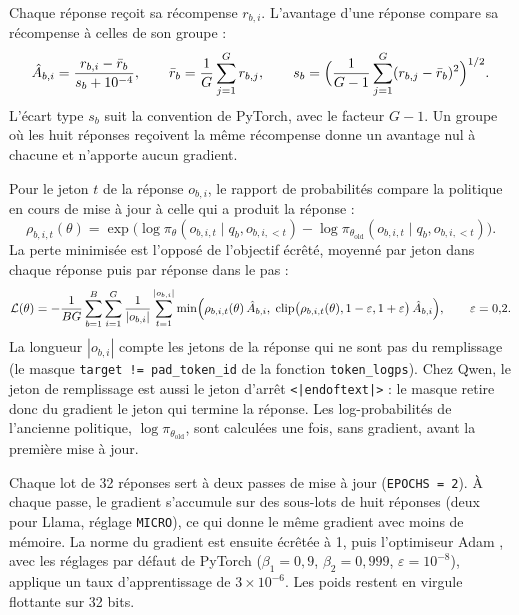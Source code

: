 Chaque réponse reçoit sa récompense $r_{b,i}$. L'avantage
d'une réponse compare sa récompense à celles de son groupe :
\begin{equation}
  \hat A_{b,i} = \frac{r_{b,i} - \bar r_b}{s_b + 10^{-4}}, \qquad
  \bar r_b = \frac1G \sum_{j=1}^{G} r_{b,j}, \qquad
  s_b = \Bigl(\frac{1}{G-1}\sum_{j=1}^{G} (r_{b,j} - \bar r_b)^2\Bigr)^{1/2}.
\end{equation}
L'écart type $s_b$ suit la convention de PyTorch, avec le facteur $G-1$. Un groupe où les huit
réponses reçoivent la même récompense donne un avantage nul à chacune et n'apporte aucun gradient.

Pour le jeton $t$ de la réponse $o_{b,i}$, le rapport de probabilités compare la politique en cours
de mise à jour à celle qui a produit la réponse :
\begin{equation}
  \rho_{b,i,t}(\theta) = \exp\bigl(\log \pi_\theta(o_{b,i,t} \mid q_b, o_{b,i,<t})
    - \log \pi_{\theta_{\text{old}}}(o_{b,i,t} \mid q_b, o_{b,i,<t})\bigr).
\end{equation}
La perte minimisée est l'opposé de l'objectif écrêté, moyenné par jeton dans chaque réponse puis
par réponse dans le pas :
\begin{equation}
  \mathcal L(\theta) = -\frac{1}{BG} \sum_{b=1}^{B} \sum_{i=1}^{G} \frac{1}{|o_{b,i}|}
  \sum_{t=1}^{|o_{b,i}|} \min\Bigl(\rho_{b,i,t}(\theta)\,\hat A_{b,i},\;
  \operatorname{clip}\bigl(\rho_{b,i,t}(\theta), 1-\varepsilon, 1+\varepsilon\bigr)\,\hat A_{b,i}\Bigr),
  \qquad \varepsilon = 0{,}2.
  \label{eq:grpo}
\end{equation}
La longueur $|o_{b,i}|$ compte les jetons de la réponse qui ne sont pas du remplissage (le masque
\texttt{target != pad\_token\_id} de la fonction \texttt{token\_logps}). Chez Qwen, le jeton de remplissage
est aussi le jeton d'arrêt \texttt{<|endoftext|>} : le masque retire donc du gradient le jeton qui termine la
réponse. Les log-probabilités de
l'ancienne politique, $\log \pi_{\theta_{\text{old}}}$, sont calculées une fois, sans gradient, avant la première
mise à jour.

Chaque lot de 32 réponses sert à deux passes de mise à jour (\texttt{EPOCHS = 2}). À chaque passe,
le gradient s'accumule sur des sous-lots de huit réponses (deux pour Llama, réglage \texttt{MICRO}),
ce qui donne le même gradient avec moins de mémoire. La norme du gradient est ensuite écrêtée à 1,
puis l'optimiseur Adam \parencite{kingma2015adam}, avec les réglages par défaut de PyTorch
($\beta_1 = 0{,}9$, $\beta_2 = 0{,}999$, $\varepsilon = 10^{-8}$), applique un taux d'apprentissage de
$3 \times 10^{-6}$. Les poids restent en virgule flottante sur 32 bits.

